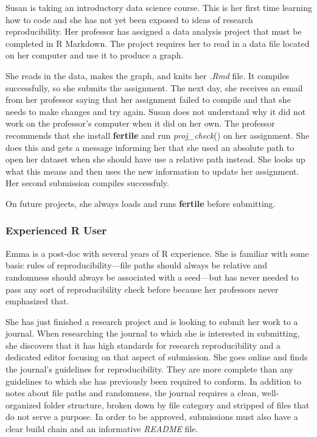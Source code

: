 \documentclass[APA,LATO1COL]{WileyNJD-v2}\usepackage[]{graphicx}\usepackage[]{color}
\newcommand{\R}{\textsf{R}\xspace}
\newcommand{\cmd}[1]{\textit{#1}}
\newcommand{\pkg}[1]{\textbf{#1}}
\newcommand{\func}[1]{\textit{#1}()}
\begin{document}
Susan is taking an introductory data science course. This is her first time learning how to code and she has not yet been exposed to ideas of research reproducibility. Her professor has assigned a data analysis project that must be completed in \R Markdown. The project requires her to read in a data file located on her computer and use it to produce a graph.

She reads in the data, makes the graph, and knits her \cmd{.Rmd} file. It compiles successfully, so she submits the assignment. The next day, she receives an email from her professor saying that her assignment failed to compile and that she needs to make changes and try again. Susan does not understand why it did not work on the professor's computer when it did on her own. The professor recommends that she install \pkg{fertile} and run \func{proj\_check} on her assignment. She does this and gets a message informing her that she used an absolute path to open her dataset when she should have use a relative path instead. She looks up what this means and then uses the new information to update her assignment. Her second submission compiles successfuly.

On future projects, she always loads and runs \pkg{fertile} before submitting.

\subsubsection{Experienced \R User}

Emma is a post-doc with several years of \R experience. She is familiar with some basic rules of reproducibility---file paths should always be relative and randomness should always be associated with a seed---but has never needed to pass any sort of reproducibility check before because her professors never emphasized that.

She has just finished a research project and is looking to submit her work to a journal. When researching the journal to which she is interested in submitting, she discovers that it has high standards for research reproducibility and a dedicated editor focusing on that aspect of submission. She goes online and finds the journal's guidelines for reproducibility. They are more complete than any guidelines to which she has previously been required to conform. In addition to notes about file paths and randomness, the journal requires a clean, well-organized folder structure, broken down by file category and stripped of files that do not serve a purpose. In order to be approved, submissions must also have a clear build chain and an informative \cmd{README} file.
\end{document}
